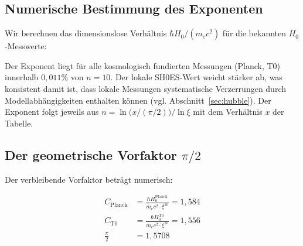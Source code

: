 \subsection{Numerische Bestimmung des Exponenten}

Wir berechnen das dimensionslose Verhältnis $\hbar H_0 / (m_e c^2)$ für die
bekannten $H_0$-Messwerte:

\begin{table}[H]
    \centering
    \caption{Dimensionsloses Verhältnis $\hbar H_0 / m_e c^2$ und zugehöriger
    $\xi$-Exponent für verschiedene $H_0$-Messungen.
    Der Exponent wird definiert durch $\hbar H_0 / m_e c^2 = C \cdot \xi^n$,
    $C \equiv \pi/2$.}
    \label{tab:exponents}
\end{table}

Der Exponent liegt für alle kosmologisch fundierten Messungen (Planck, T0)
innerhalb $0{,}011\%$ von $n = 10$. Der lokale SH0ES-Wert weicht stärker ab,
was konsistent damit ist, dass lokale Messungen systematische Verzerrungen
durch Modellabhängigkeiten enthalten können (vgl. Abschnitt~\ref{sec:hubble}).
Der Exponent folgt jeweils aus $n = \ln\bigl(x/(\pi/2)\bigr)/\ln\xi$ mit dem Verhältnis $x$
der Tabelle.

\subsection{Der geometrische Vorfaktor \texorpdfstring{$\pi/2$}{pi/2}}

Der verbleibende Vorfaktor beträgt numerisch:

\begin{align}
    C_{\text{Planck}} &= \frac{\hbar H_0^{\text{Planck}}}{m_e c^2 \cdot \xi^{10}}
    = 1{,}584 \\[4pt]
    C_{\text{T0}}     &= \frac{\hbar H_0^{\text{T0}}}{m_e c^2 \cdot \xi^{10}}
    = 1{,}556 \\[4pt]
    \frac{\pi}{2}     &= 1{,}5708
\end{align}

